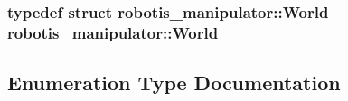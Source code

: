 \subsubsection[{\texorpdfstring{World}{World}}]{\setlength{\rightskip}{0pt plus 5cm}typedef struct {\bf robotis\+\_\+manipulator\+::\+World}  {\bf robotis\+\_\+manipulator\+::\+World}}\hypertarget{namespacerobotis__manipulator_ad572cd4a47272e32196fdc45759963e3}{}\label{namespacerobotis__manipulator_ad572cd4a47272e32196fdc45759963e3}


\subsection{Enumeration Type Documentation}
